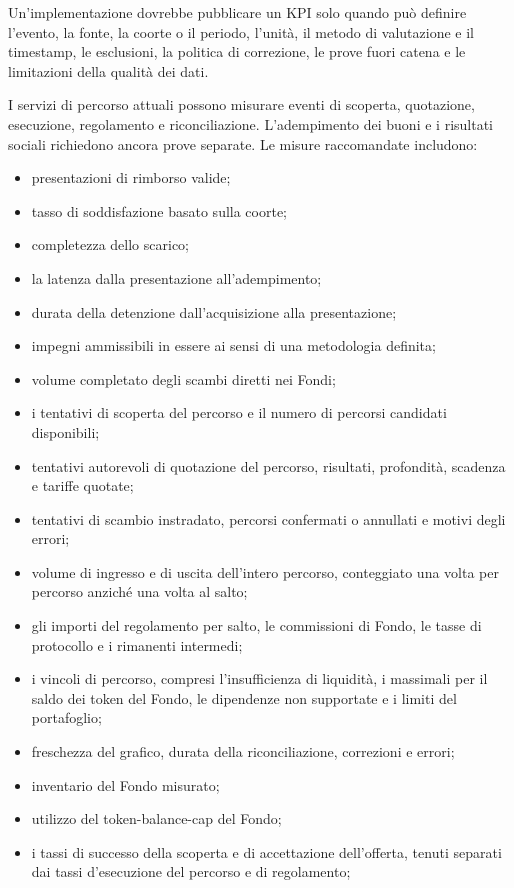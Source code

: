 \documentclass[11pt]{article}
\begin{document}
Un'implementazione dovrebbe pubblicare un KPI solo quando può definire l'evento, la fonte, la coorte o il periodo, l'unità, il metodo di valutazione e il timestamp, le esclusioni, la politica di correzione, le prove fuori catena e le limitazioni della qualità dei dati.

I servizi di percorso attuali possono misurare eventi di scoperta, quotazione, esecuzione, regolamento e riconciliazione. L'adempimento dei buoni e i risultati sociali richiedono ancora prove separate. Le misure raccomandate includono:

\begin{itemize}[leftmargin=*]
\item presentazioni di rimborso valide;
\item tasso di soddisfazione basato sulla coorte;
\item completezza dello scarico;
\item la latenza dalla presentazione all'adempimento;
\item durata della detenzione dall'acquisizione alla presentazione;
\item impegni ammissibili in essere ai sensi di una metodologia definita;
\item volume completato degli scambi diretti nei Fondi;
\item i tentativi di scoperta del percorso e il numero di percorsi candidati disponibili;
\item tentativi autorevoli di quotazione del percorso, risultati, profondità, scadenza e tariffe quotate;
\item tentativi di scambio instradato, percorsi confermati o annullati e motivi degli errori;
\item volume di ingresso e di uscita dell'intero percorso, conteggiato una volta per percorso anziché una volta al salto;
\item gli importi del regolamento per salto, le commissioni di Fondo, le tasse di protocollo e i rimanenti intermedi;
\item i vincoli di percorso, compresi l'insufficienza di liquidità, i massimali per il saldo dei token del Fondo, le dipendenze non supportate e i limiti del portafoglio;
\item freschezza del grafico, durata della riconciliazione, correzioni e errori;
\item inventario del Fondo misurato;
\item utilizzo del token-balance-cap del Fondo;
\item i tassi di successo della scoperta e di accettazione dell'offerta, tenuti separati dai tassi d'esecuzione del percorso e di regolamento;

\end{itemize}
\end{document}
